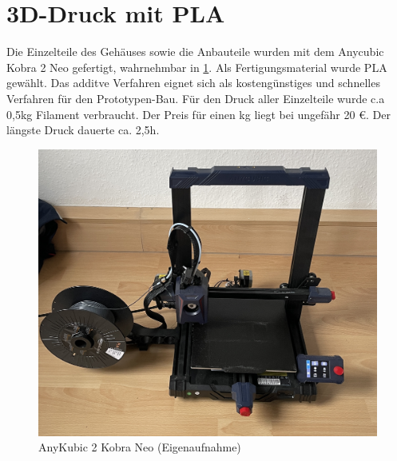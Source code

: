\section{3D-Druck mit PLA}
Die Einzelteile des Gehäuses sowie die Anbauteile wurden mit dem Anycubic Kobra 2 Neo gefertigt, wahrnehmbar in \ref{AKK2N}. Als Fertigungsmaterial wurde PLA gewählt. Das additve Verfahren eignet sich als kostengünstiges und schnelles Verfahren für den Prototypen-Bau. Für den Druck aller Einzelteile wurde c.a 0,5kg Filament verbraucht. Der Preis für einen kg liegt bei ungefähr 20 €. Der längste Druck dauerte ca. 2,5h. 

	 \begin{figure}[H]
	 	\begin{center}
	 		\includegraphics[width=\textwidth]{Images/Konstruktion/AKK2N.jpg}
	 		\caption{AnyKubic 2 Kobra Neo (Eigenaufnahme)} \label{AKK2N}
	 	\end{center}
	 \end{figure}  
